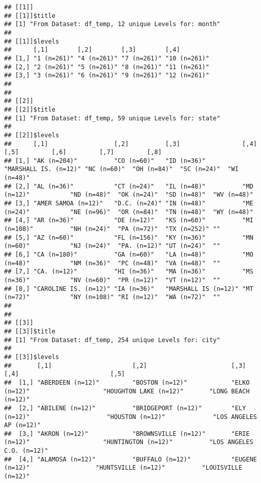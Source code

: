 \documentclass[
]{book}
\begin{document}
\begin{verbatim}
## [[1]]
## [[1]]$title
## [1] "From Dataset: df_temp, 12 unique Levels for: month"
## 
## [[1]]$levels
##      [,1]        [,2]        [,3]        [,4]        
## [1,] "1 (n=261)" "4 (n=261)" "7 (n=261)" "10 (n=261)"
## [2,] "2 (n=261)" "5 (n=261)" "8 (n=261)" "11 (n=261)"
## [3,] "3 (n=261)" "6 (n=261)" "9 (n=261)" "12 (n=261)"
## 
## 
## [[2]]
## [[2]]$title
## [1] "From Dataset: df_temp, 59 unique Levels for: state"
## 
## [[2]]$levels
##      [,1]                  [,2]          [,3]                 [,4]                  [,5]         [,6]         [,7]         [,8]       
## [1,] "AK (n=204)"          "CO (n=60)"   "ID (n=36)"          "MARSHALL IS. (n=12)" "NC (n=60)"  "OH (n=84)"  "SC (n=24)"  "WI (n=48)"
## [2,] "AL (n=36)"           "CT (n=24)"   "IL (n=48)"          "MD (n=12)"           "ND (n=48)"  "OK (n=24)"  "SD (n=48)"  "WV (n=48)"
## [3,] "AMER SAMOA (n=12)"   "D.C. (n=24)" "IN (n=48)"          "ME (n=24)"           "NE (n=96)"  "OR (n=84)"  "TN (n=48)"  "WY (n=48)"
## [4,] "AR (n=36)"           "DE (n=12)"   "KS (n=60)"          "MI (n=108)"          "NH (n=24)"  "PA (n=72)"  "TX (n=252)" ""         
## [5,] "AZ (n=60)"           "FL (n=156)"  "KY (n=36)"          "MN (n=60)"           "NJ (n=24)"  "PA. (n=12)" "UT (n=24)"  ""         
## [6,] "CA (n=180)"          "GA (n=60)"   "LA (n=48)"          "MO (n=48)"           "NM (n=36)"  "PC (n=48)"  "VA (n=48)"  ""         
## [7,] "CA. (n=12)"          "HI (n=36)"   "MA (n=36)"          "MS (n=36)"           "NV (n=60)"  "PR (n=12)"  "VT (n=12)"  ""         
## [8,] "CAROLINE IS. (n=12)" "IA (n=36)"   "MARSHALL IS (n=12)" "MT (n=72)"           "NY (n=108)" "RI (n=12)"  "WA (n=72)"  ""         
## 
## 
## [[3]]
## [[3]]$title
## [1] "From Dataset: df_temp, 254 unique Levels for: city"
## 
## [[3]]$levels
##       [,1]                      [,2]                       [,3]                             [,4]                         [,5]                            
##  [1,] "ABERDEEN (n=12)"         "BOSTON (n=12)"            "ELKO (n=12)"                    "HOUGHTON LAKE (n=12)"       "LONG BEACH (n=12)"             
##  [2,] "ABILENE (n=12)"          "BRIDGEPORT (n=12)"        "ELY (n=12)"                     "HOUSTON (n=12)"             "LOS ANGELES AP (n=12)"         
##  [3,] "AKRON (n=12)"            "BROWNSVILLE (n=12)"       "ERIE (n=12)"                    "HUNTINGTON (n=12)"          "LOS ANGELES C.O. (n=12)"       
##  [4,] "ALAMOSA (n=12)"          "BUFFALO (n=12)"           "EUGENE (n=12)"                  "HUNTSVILLE (n=12)"          "LOUISVILLE (n=12)"             

\end{verbatim}
\end{document}
